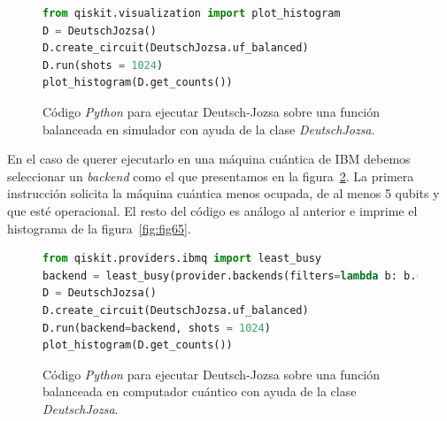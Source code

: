 \begin{figure}[t]
\begin{lstlisting}[language=Python]
from qiskit.visualization import plot_histogram
D = DeutschJozsa()
D.create_circuit(DeutschJozsa.uf_balanced)
D.run(shots = 1024)
plot_histogram(D.get_counts())
\end{lstlisting}
\caption{Código \textit{Python} para ejecutar Deutsch-Jozsa sobre una función balanceada en simulador con ayuda de la clase \textit{DeutschJozsa}.}
\label{code:code62}
\end{figure}

En el caso de querer ejecutarlo en una máquina cuántica de IBM debemos seleccionar un \textit{backend}  como el que presentamos en la figura~\ref{code:code63}. La primera instrucción solicita la máquina cuántica menos ocupada, de al menos 5 qubits y que esté operacional. El resto del código es análogo al anterior e imprime el histograma de la figura~\ref{fig:fig65}.

\begin{figure}[tb!]
\begin{lstlisting}[language=Python]
from qiskit.providers.ibmq import least_busy
backend = least_busy(provider.backends(filters=lambda b: b.configuration().n_qubits >= 5 and not b.configuration().simulator and b.status().operational==True))
D = DeutschJozsa()
D.create_circuit(DeutschJozsa.uf_balanced)
D.run(backend=backend, shots = 1024)
plot_histogram(D.get_counts())
\end{lstlisting}
\caption{Código \textit{Python} para ejecutar Deutsch-Jozsa sobre una función balanceada en computador cuántico con ayuda de la clase \textit{DeutschJozsa}.}
\label{code:code63}
\end{figure}

